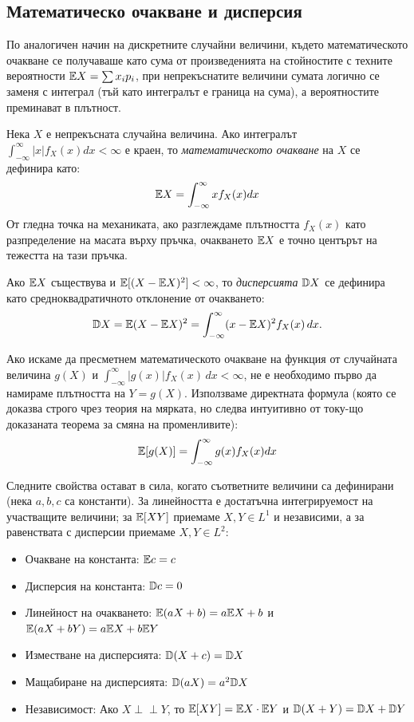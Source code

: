 \subsection{Математическо очакване и дисперсия}

По аналогичен начин на дискретните случайни величини, където математическото очакване се получаваше като сума от произведенията на стойностите с техните вероятности $\mathbb{E} X = \sum x_i p_i$, при непрекъснатите величини сумата логично се заменя с интеграл (тъй като интегралът е граница на сума), а вероятностите преминават в плътност.

\begin{defn}
Нека $X$ е непрекъсната случайна величина. Ако интегралът $\int_{-\infty}^{\infty} |x| f_X(x) dx < \infty$ е краен, то \emph{математическото очакване} на $X$ се дефинира като:
\[
\mathbb{E} X = \int_{-\infty}^{\infty} x f_X(x) dx
\]
От гледна точка на механиката, ако разглеждаме плътността $f_X(x)$ като разпределение на масата върху пръчка, очакването $\mathbb{E} X$ е точно центърът на тежестта на тази пръчка.
\end{defn}

\begin{defn}\label{def:var-continuous}
Ако $\mathbb{E} X$ съществува и $\mathbb{E}[(X-\mathbb{E} X)^2]<\infty$, то \emph{дисперсията} $\mathbb{D} X$ се дефинира като средноквадратичното отклонение от очакването:
\[
\mathbb{D} X = \mathbb{E}(X - \mathbb{E} X)^2 = \int_{-\infty}^{\infty} (x - \mathbb{E} X)^2 f_X(x) \, dx .
\]
\end{defn}

Ако искаме да пресметнем математическото очакване на функция от случайната величина $g(X)$ и $\int_{-\infty}^{\infty}|g(x)|f_X(x)\,dx<\infty$, не е необходимо първо да намираме плътността на $Y=g(X)$. Използваме директната формула (която се доказва строго чрез теория на мярката, но следва интуитивно от току-що доказаната теорема за смяна на променливите):
\[
\mathbb{E}[g(X)] = \int_{-\infty}^{\infty} g(x) f_X(x) dx
\]

\begin{prop}\label{prop:exp-var-props}
Следните свойства остават в сила, когато съответните величини са дефинирани (нека $a, b, c$ са константи). За линейността е достатъчна интегрируемост на участващите величини; за $\mathbb{E}[XY]$ приемаме $X,Y\in L^1$ и независими, а за равенствата с дисперсии приемаме $X,Y\in L^2$:
\begin{itemize}
    \item Очакване на константа: $\mathbb{E} c = c$
    \item Дисперсия на константа: $\mathbb{D} c = 0$
    \item Линейност на очакването: $\mathbb{E}(aX + b) = a\mathbb{E} X + b$ и $\mathbb{E}(aX + bY) = a\mathbb{E} X + b\mathbb{E} Y$
    \item Изместване на дисперсията: $\mathbb{D}(X + c) = \mathbb{D} X$
    \item Мащабиране на дисперсията: $\mathbb{D}(aX) = a^2 \mathbb{D} X$
    \item Независимост: Ако $X \perp\!\!\!\perp Y$, то $\mathbb{E}[XY] = \mathbb{E} X \cdot \mathbb{E} Y$ и $\mathbb{D}(X + Y) = \mathbb{D} X + \mathbb{D} Y$
\end{itemize}
\end{prop}

